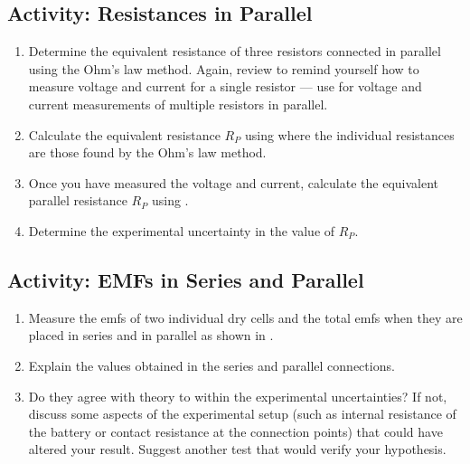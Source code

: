\subsection{Activity: Resistances in Parallel}
\begin{enumerate}
	\item Determine the equivalent resistance of three resistors connected in parallel using the Ohm's law method.  Again, review  to remind yourself how to measure voltage and current for a single resistor --- use  for voltage and current measurements of multiple resistors in parallel.
	
	\item Calculate the equivalent resistance $R_P$ using  where the individual resistances are those found by the Ohm's law method.

	\item Once you have measured the voltage and current, calculate the equivalent parallel resistance $R_P$ using .
	
	\item Determine the experimental uncertainty in the value of $R_P$. 

\end{enumerate}


\subsection{Activity: EMFs in Series and Parallel}
\begin{enumerate}
	\item Measure the emfs of two individual dry cells and the total emfs when they are placed in series and in parallel as shown in .
	
	\item Explain the values obtained in the series and parallel connections.
	
	\item Do they agree with theory to within the experimental uncertainties?  If not, discuss some aspects of the experimental setup (such as internal resistance of the battery or contact resistance at the connection points) that could have altered your result.  Suggest another test that would verify your hypothesis.
\end{enumerate}


